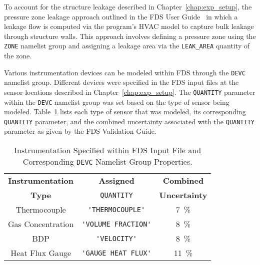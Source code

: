 To account for the structure leakage described in Chapter~\ref{chap:exp_setup}, the pressure zone leakage approach outlined in the FDS User Guide~\cite{FDS_Users_Guide} in which a leakage flow is computed via the program's HVAC model to capture bulk leakage through structure walls. This approach involves defining a pressure zone using the \verb|ZONE| namelist group and assigning a leakage area via the \verb|LEAK_AREA| quantity of the zone.

Various instrumentation devices can be modeled within FDS through the \verb|DEVC| namelist group. Different devices were specified in the FDS input files at the sensor locations described in Chapter~\ref{chap:exp_setup}. The \verb|QUANTITY| parameter within the \verb|DEVC| namelist group was set based on the type of sensor being modeled. Table~\ref{table:FDS_sensor_info} lists each type of sensor that was modeled, its corresponding \verb|QUANTITY| parameter, and the combined uncertainty associated with the \verb|QUANTITY| parameter as given by the FDS Validation Guide.  

\begin{table}[!ht]
\cprotect\caption{Instrumentation Specified within FDS Input File and Corresponding \verb|DEVC| Namelist Group Properties.}
\begin{center}
\begin{tabular}{ccc}
\toprule
\textbf{Instrumentation} & \textbf{Assigned}           & \textbf{Combined}       \\
\textbf{Type}                     & \verb|QUANTITY|             & \textbf{Uncertainty}        \\
\midrule
Thermocouple            & \verb|'THERMOCOUPLE'|       &     7~\%     \\
Gas Concentration       & \verb|'VOLUME FRACTION'|    &     8~\%     \\
BDP                     & \verb|'VELOCITY'|           &     8~\%     \\
Heat Flux Gauge         & \verb|'GAUGE HEAT FLUX'|    &     11~\%     \\
\bottomrule
\end{tabular}
\end{center}
\label{table:FDS_sensor_info}
\end{table}


